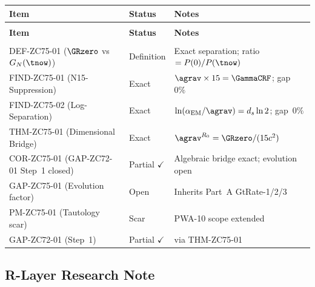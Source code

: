\documentclass[12pt, a4paper]{article}
\renewcommand{\aEM}{\alpha_{\rm EM}}
\begin{document}
{\small
\setlength{\LTpre}{4pt}\setlength{\LTpost}{4pt}
\renewcommand{\arraystretch}{1.30}
\begin{longtable}{>{\raggedright\arraybackslash}p{5.5cm}
                  >{\centering\arraybackslash}p{2.2cm}
                  >{\raggedright\arraybackslash}p{5.0cm}}
\toprule
\textbf{Item} & \textbf{Status} & \textbf{Notes} \\
\midrule
\endfirsthead
\multicolumn{3}{l}{\small\textit{(continued)}}\\[4pt]
\toprule\textbf{Item}&\textbf{Status}&\textbf{Notes}\\\midrule
\endhead
\midrule\multicolumn{3}{r}{\small\textit{(continues)}}\\
\endfoot
\bottomrule
\endlastfoot
DEF-ZC75-01 ($\GRzero$ vs $G_N(\tnow)$)
  & Definition & Exact separation; ratio $= P(0)/P(\tnow)$ \\[4pt]
FIND-ZC75-01 (N15-Suppression)
  & Exact & $\agrav \times 15 = \GammaCRF$; gap~$0\%$ \\[4pt]
FIND-ZC75-02 (Log-Separation)
  & Exact & $\ln(\aEM/\agrav) = d_s\ln2$; gap~$0\%$ \\[4pt]
THM-ZC75-01 (Dimensional Bridge)
  & Exact & $\agrav^{R_0} = \GRzero/(15c^2)$ \\[4pt]
COR-ZC75-01 (GAP-ZC72-01 Step~1 closed)
  & Partial $\checkmark$ & Algebraic bridge exact; evolution open \\[4pt]
GAP-ZC75-01 (Evolution factor)
  & Open & Inherits Part~A GtRate-1/2/3 \\[4pt]
PM-ZC75-01 (Tautology scar)
  & Scar & PWA-10 scope extended \\[4pt]
\midrule
GAP-ZC72-01 (Step~1)
  & Partial $\checkmark$ & via THM-ZC75-01 \\
\bottomrule
\end{longtable}
}

\subsection{R-Layer Research Note}
\label{sec:rlayer}
\end{document}
